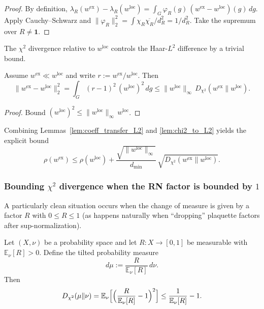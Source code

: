 \begin{proof}
By definition,
$\lambda_R(w^{\mathrm{ex}})-\lambda_R(w^{\mathrm{loc}})=\int_G \varphi_R(g)\,(w^{\mathrm{ex}}-w^{\mathrm{loc}})(g)\,dg$.
Apply Cauchy--Schwarz and $\|\varphi_R\|_2^2=\int \chi_R\overline{\chi_R}/d_R^2=1/d_R^2$.
Take the supremum over $R\neq \mathbf 1$.
\end{proof}

The $\chi^2$ divergence relative to $w^{\mathrm{loc}}$ controls the Haar-$L^2$ difference by a trivial bound.

\begin{lemma}\label{lem:chi2_to_L2}
Assume $w^{\mathrm{ex}}\ll w^{\mathrm{loc}}$ and write $r:=w^{\mathrm{ex}}/w^{\mathrm{loc}}$.
Then
\begin{equation}\label{eq:L2_from_chi2}
\|w^{\mathrm{ex}}-w^{\mathrm{loc}}\|_2^2
=\int_G (r-1)^2\,(w^{\mathrm{loc}})^2\,dg
\le \|w^{\mathrm{loc}}\|_{\infty}\,D_{\chi^2}(w^{\mathrm{ex}}\|w^{\mathrm{loc}}).
\end{equation}
\end{lemma}

\begin{proof}
Bound $(w^{\mathrm{loc}})^2\le \|w^{\mathrm{loc}}\|_{\infty}\,w^{\mathrm{loc}}$.
\end{proof}

Combining Lemmas~\ref{lem:coeff_transfer_L2} and \ref{lem:chi2_to_L2} yields the explicit bound
\begin{equation}\label{eq:rho_transfer_chi2}
\rho(w^{\mathrm{ex}})
\le
\rho(w^{\mathrm{loc}})
+
\frac{\sqrt{\|w^{\mathrm{loc}}\|_{\infty}}}{d_{\min}}\,
\sqrt{D_{\chi^2}(w^{\mathrm{ex}}\|w^{\mathrm{loc}})}.
\end{equation}

\subsubsection{Bounding \texorpdfstring{$\chi^2$}{chi2} divergence when the RN factor is bounded by \texorpdfstring{$1$}{1}}

A particularly clean situation occurs when the change of measure is given by a factor $R$ with
$0\le R\le 1$ (as happens naturally when ``dropping'' plaquette factors after sup-normalization).

\begin{lemma}
\label{lem:R_le_1_chi2}
Let $(X,\nu)$ be a probability space and let $R:X\to[0,1]$ be measurable with $\mathbb E_{\nu}[R]>0$.
Define the tilted probability measure
\[
d\mu:=\frac{R}{\mathbb E_{\nu}[R]}\,d\nu.
\]
Then
\begin{equation}\label{eq:chi2_bound_ER}
D_{\chi^2}(\mu\|\nu)
=\mathbb E_{\nu}\Bigl[\Bigl(\frac{R}{\mathbb E_{\nu}[R]}-1\Bigr)^2\Bigr]
\le \frac{1}{\mathbb E_{\nu}[R]}-1.
\end{equation}
\end{lemma}

